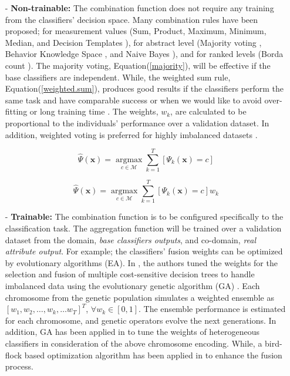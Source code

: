 \begin{itemize}
    \item[-]\textbf{Non-trainable:} 
    The combination function does not require any training from the classifiers' decision space. Many combination rules have been proposed; for measurement values (Sum, Product, Maximum, Minimum, Median, and Decision Templates \cite{Kuncheva2001}), for abstract level (Majority voting \cite{Kittler1998}, Behavior Knowledge Space \cite{Huang1995}, and Naive Bayes \cite{xu1992}), and for ranked levels (Borda count \cite{Ho1994}). The majority voting, Equation(\ref{majority}), will be effective if the base classifiers are independent. While, the weighted sum rule, Equation(\ref{weighted.sum}), produces good results if the classifiers perform the same task and have comparable success or when we would like to avoid over-fitting or long training time \cite{rokach2009}. The weights, $w_k$, are calculated to be proportional to the individuals' performance over a validation dataset.  In addition, weighted voting is preferred for highly imbalanced datasets \cite{kuncheva2014a,krawczyk2014}.  
    
\begin{equation}
\label{majority}
\hat{\Psi}(\textbf{x})=\mathop{\arg\max}\limits_{c \in \mathcal{M}} \mathop{\sum}\limits_{k=1}^T \left[\Psi_k(\textbf{x})=c\right] 
\end{equation}    

\begin{equation}
\label{weighted.sum}
\hat{\Psi}(\textbf{x})=\mathop{\arg\max}\limits_{c \in \mathcal{M}} \mathop{\sum}\limits_{k=1}^T \left[\Psi_k(\textbf{x})=c\right]w_k
\end{equation}
    
    
     \item[-]\textbf{Trainable:}  
The combination function is to be configured specifically to the classification task. The aggregation function will be trained over a validation dataset from the domain, \textit{base classifiers outputs}, and co-domain, \textit{real attribute output}. For example; the classifiers' fusion weights can be optimized by evolutionary algorithms (EA).  In \cite{krawczyk2014}, the authors tuned the weights for the selection and fusion of multiple cost-sensitive decision trees to handle imbalanced data using the evolutionary genetic algorithm (GA) \cite{mitchell1998}. Each chromosome from the genetic population simulates a weighted ensemble as $\left[w_1, w_2, \ldots, w_k, \ldots w_T\right]^T$, $ \forall w_k \in [0,1]$. The ensemble performance is estimated for each chromosome, and genetic operators evolve the next generations. In addition, GA has been applied in \cite{sikora2015} to tune the weights of heterogeneous classifiers in consideration of the above chromosome encoding. While, a bird-flock based optimization algorithm has been applied in \cite{cordeiro2011, kausar2010} to enhance the fusion process.          
      

\end{itemize}
